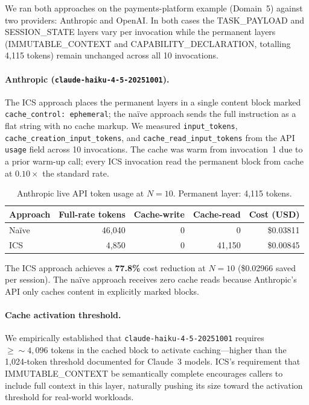 \documentclass[11pt]{article}
\begin{document}
We ran both approaches on the payments-platform example (Domain~5) against two
providers: Anthropic and OpenAI. In both cases the TASK\_PAYLOAD and
SESSION\_STATE layers vary per invocation while the permanent layers
(IMMUTABLE\_CONTEXT and CAPABILITY\_DECLARATION, totalling 4,115 tokens) remain
unchanged across all 10 invocations.

\paragraph{Anthropic (\texttt{claude-haiku-4-5-20251001}).}
The ICS approach places the permanent layers in a single content block marked
\texttt{cache\_control: ephemeral}; the na\"{i}ve approach sends the full
instruction as a flat string with no cache markup. We measured
\texttt{input\_tokens}, \texttt{cache\_creation\_input\_tokens}, and
\texttt{cache\_read\_input\_tokens} from the API \texttt{usage} field across
10 invocations. The cache was warm from invocation~1 due to a prior warm-up
call; every ICS invocation read the permanent block from cache at $0.10\times$
the standard rate.

\begin{table}[h]
\centering
\caption{Anthropic live API token usage at $N{=}10$. Permanent layer: 4,115 tokens.}
\label{tab:live-anthropic}
\begin{tabular}{lrrrr}
\toprule
\textbf{Approach} & \textbf{Full-rate tokens} & \textbf{Cache-write} & \textbf{Cache-read} & \textbf{Cost (USD)} \\
\midrule
Na\"{i}ve & 46,040 & 0      & 0      & \$0.03811 \\
ICS       & 4,850  & 0      & 41,150 & \$0.00845 \\
\bottomrule
\end{tabular}
\end{table}

The ICS approach achieves a \textbf{77.8\%} cost reduction at $N{=}10$
(\$0.02966 saved per session). The na\"{i}ve approach receives zero cache
reads because Anthropic's API only caches content in explicitly marked blocks.

\paragraph{Cache activation threshold.}
We empirically established that \texttt{claude-haiku-4-5-20251001} requires
$\geq{\sim}4{,}096$ tokens in the cached block to activate caching---higher
than the 1,024-token threshold documented for Claude~3 models. ICS's
requirement that IMMUTABLE\_CONTEXT be semantically complete encourages callers
to include full context in this layer, naturally pushing its size toward the
activation threshold for real-world workloads.
\end{document}
